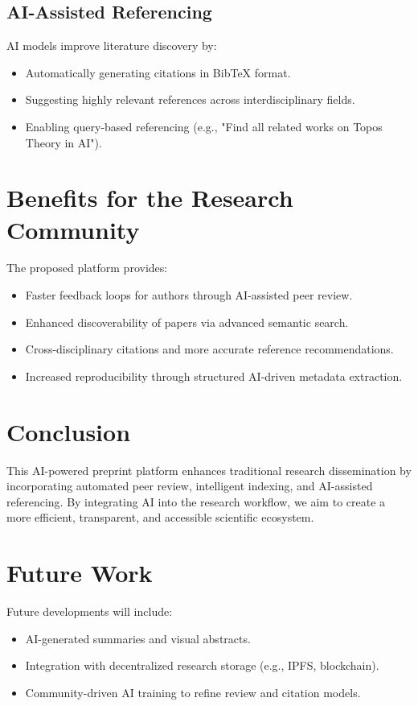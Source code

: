 \documentclass{article}
\begin{document}
\subsection{AI-Assisted Referencing}
AI models improve literature discovery by:
\begin{itemize}
    \item Automatically generating citations in BibTeX format.
    \item Suggesting highly relevant references across interdisciplinary fields.
    \item Enabling query-based referencing (e.g., "Find all related works on Topos Theory in AI").
\end{itemize}

\section{Benefits for the Research Community}
The proposed platform provides:
\begin{itemize}
    \item Faster feedback loops for authors through AI-assisted peer review.
    \item Enhanced discoverability of papers via advanced semantic search.
    \item Cross-disciplinary citations and more accurate reference recommendations.
    \item Increased reproducibility through structured AI-driven metadata extraction.
\end{itemize}

\section{Conclusion}
This AI-powered preprint platform enhances traditional research dissemination by incorporating automated peer review, intelligent indexing, and AI-assisted referencing. By integrating AI into the research workflow, we aim to create a more efficient, transparent, and accessible scientific ecosystem. 

\section*{Future Work}
Future developments will include:
\begin{itemize}
    \item AI-generated summaries and visual abstracts.
    \item Integration with decentralized research storage (e.g., IPFS, blockchain).
    \item Community-driven AI training to refine review and citation models.
\end{itemize}



\end{document}
